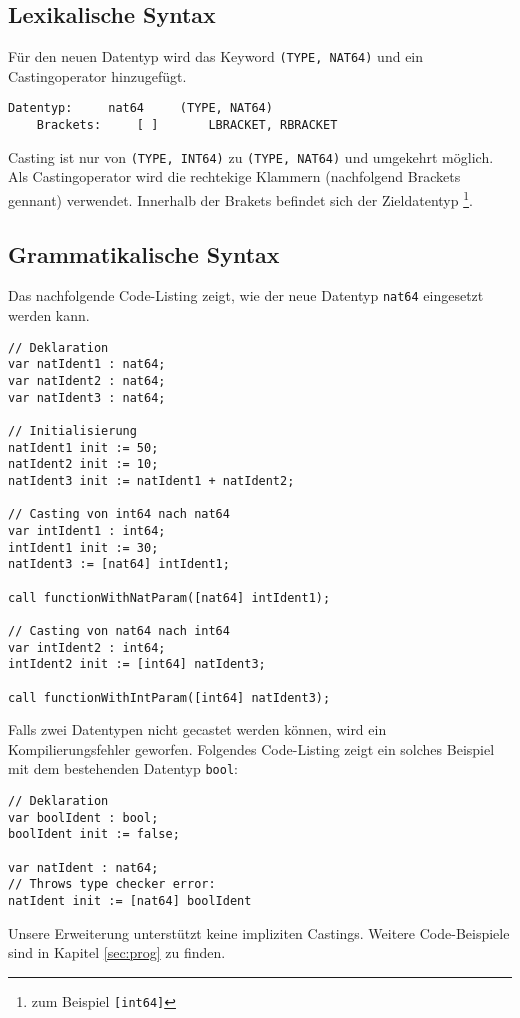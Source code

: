 \documentclass[10pt, a4paper, twocolumn]{article} %
\begin{document}
\subsection{Lexikalische Syntax}
Für den neuen Datentyp wird das Keyword \texttt{(TYPE, NAT64)} und ein Castingoperator hinzugefügt.

\begin{lstlisting}[backgroundcolor = \color{lightgray},
xleftmargin = 0.05cm,
framexleftmargin = 0.05em]
    Datentyp:     nat64     (TYPE, NAT64)
    Brackets:     [ ]       LBRACKET, RBRACKET
\end{lstlisting}

Casting ist nur von \texttt{(TYPE, INT64)} zu \texttt{(TYPE, NAT64)} und umgekehrt möglich.
Als Castingoperator wird die rechtekige Klammern (nachfolgend Brackets gennant) verwendet.
Innerhalb der Brakets befindet sich der Zieldatentyp \footnote{zum Beispiel \texttt{[int64]}}.

\subsection{Grammatikalische Syntax}
Das nachfolgende Code-Listing zeigt, wie der neue Datentyp \texttt{nat64} eingesetzt werden kann.
\begin{lstlisting}
// Deklaration
var natIdent1 : nat64;
var natIdent2 : nat64;
var natIdent3 : nat64;

// Initialisierung
natIdent1 init := 50;
natIdent2 init := 10;
natIdent3 init := natIdent1 + natIdent2;

// Casting von int64 nach nat64
var intIdent1 : int64;
intIdent1 init := 30;
natIdent3 := [nat64] intIdent1;

call functionWithNatParam([nat64] intIdent1);

// Casting von nat64 nach int64
var intIdent2 : int64;
intIdent2 init := [int64] natIdent3;

call functionWithIntParam([int64] natIdent3);
\end{lstlisting}
Falls zwei Datentypen nicht gecastet werden können, wird ein Kompilierungsfehler geworfen.
Folgendes Code-Listing zeigt ein solches Beispiel mit dem bestehenden Datentyp \texttt{bool}:
\begin{lstlisting}
// Deklaration
var boolIdent : bool;
boolIdent init := false;

var natIdent : nat64;
// Throws type checker error:
natIdent init := [nat64] boolIdent
\end{lstlisting}
Unsere Erweiterung unterstützt keine impliziten Castings.
Weitere Code-Beispiele sind in Kapitel \ref{sec:prog} zu finden.
\end{document}
